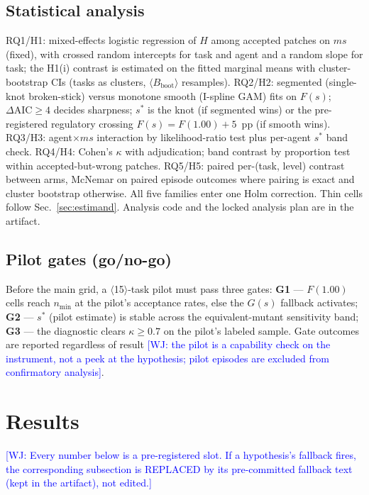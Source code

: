 \documentclass[conference]{IEEEtran}
\newcommand{\PH}[1]{\colorbox{gray!18}{\small$\langle$#1$\rangle$}}
\newcommand{\wj}[1]{\textcolor{blue}{\footnotesize [WJ: #1]}}
\newcommand{\ms}{\ensuremath{\mathit{ms}}}
\newcommand{\Fs}{\ensuremath{F(s)}}
\newcommand{\Gs}{\ensuremath{G(s)}}
\begin{document}
\subsection{Statistical analysis}\label{sec:analysis}
RQ1/H1: mixed-effects logistic regression of $H$ among accepted patches
on \ms{} (fixed), with crossed random intercepts for task and agent and
a random slope for task; the H1(i) contrast is estimated on the fitted
marginal means with cluster-bootstrap CIs (tasks as clusters,
\PH{$B_{\mathrm{boot}}$} resamples). RQ2/H2: segmented (single-knot
broken-stick) versus monotone smooth (I-spline GAM) fits on \Fs{};
$\Delta\mathrm{AIC} \ge 4$ decides sharpness; $s^\ast$ is the knot (if
segmented wins) or the pre-registered regulatory crossing
$F(s) = F(1.00) + 5$~pp (if smooth wins). RQ3/H3: agent$\times$\ms{}
interaction by likelihood-ratio test plus per-agent $s^\ast$ band check.
RQ4/H4: Cohen's $\kappa$ with adjudication; band contrast by
proportion test within accepted-but-wrong patches. RQ5/H5: paired
per-(task, level) contrast between arms, McNemar on paired episode
outcomes where pairing is exact and cluster bootstrap otherwise. All
five families enter one Holm correction. Thin cells follow
Sec.~\ref{sec:estimand}. Analysis code and the locked analysis plan are
in the artifact.

\subsection{Pilot gates (go/no-go)}\label{sec:pilot}
Before the main grid, a \PH{15}-task pilot must pass three gates:
\textbf{G1} --- $F(1.00)$ cells reach $n_{\min}$ at the pilot's
acceptance rates, else the \Gs{} fallback activates; \textbf{G2} ---
$s^\ast$ (pilot estimate) is stable across the equivalent-mutant
sensitivity band; \textbf{G3} --- the diagnostic clears $\kappa \ge 0.7$
on the pilot's labeled sample. Gate outcomes are reported regardless of
result \wj{the pilot is a capability check on the instrument, not a
peek at the hypothesis; pilot episodes are excluded from confirmatory
analysis}.

\section{Results}\label{sec:results}
\wj{Every number below is a pre-registered slot. If a hypothesis's
fallback fires, the corresponding subsection is REPLACED by its
pre-committed fallback text (kept in the artifact), not edited.}
\end{document}
